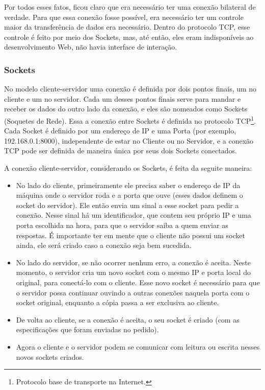 \documentclass[a4paper,12pt]{article}
\begin{document}
Por todos esses fatos, ficou claro que era necessário ter uma conexão bilateral de verdade. Para que essa conexão fosse possível, era necessário ter um controle maior da transferência de dados era necessário. Dentro do protocolo TCP, esse controle é feito por meio dos Sockets, mas, até então, eles eram indisponíveis ao desenvolvimento Web, não havia interface de interação.


\subsubsection{Sockets}

No modelo cliente-servidor uma conexão é definida por dois pontos finais, um no cliente e um no servidor. Cada um desses pontos finais serve para mandar e receber os dados do outro lado da conexão, e eles são nomeados como Sockets (Soquetes de Rede). Essa a conexão entre Sockets é definida no protocolo TCP\footnote{Protocolo base de transporte na Internet.}. Cada Socket é definido por um endereço de IP e uma Porta (por exemplo, 192.168.0.1:8000), independente de estar no Cliente ou no Servidor, e a conexão TCP pode ser definida de maneira única por seus dois Sockets conectados.

A conexão cliente-servidor, considerando os Sockets, é feita da seguite maneira:

\begin{itemize}

    \item No lado do cliente, primeiramente ele precisa saber o endereço de IP da máquina onde o servidor roda e a porta que ouve (esses dados definem o socket do servidor). Ele então envia um sinal a esse socket para pedir a conexão. Nesse sinal há um identificador, que contem seu próprio IP e uma porta escolhida na hora, para que o servidor saiba a quem enviar as respostas. É importante ter em mente que o cliente não possui um socket ainda, ele será criado caso a conexão seja bem sucedida.

    \item No lado do servidor, se não ocorrer nenhum erro, a conexão é aceita. Neste momento, o servidor cria um novo socket com o mesmo IP e porta local do original, para conectá-lo com o cliente. Esse novo socket é necessário para que o servidor possa continuar ouvindo a outras conexões naquela porta com o socket original, enquanto a cópia passa a ser exclusiva ao cliente.

    \item De volta ao cliente, se a conexão é aceita, o seu socket é criado (com as especificações que foram enviadas no pedido).

    \item Agora o cliente e o servidor podem se comunicar com leitura ou escrita nesses novos sockets criados.
\end{itemize}
\end{document}
